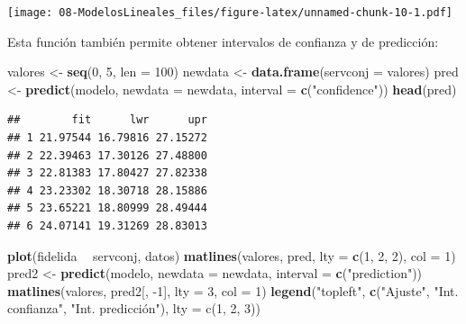 \documentclass[]{book}
\newenvironment{Shaded}{\begin{snugshade}}{\end{snugshade}}
\newcommand{\DataTypeTok}[1]{\textcolor[rgb]{0.13,0.29,0.53}{#1}}
\newcommand{\DecValTok}[1]{\textcolor[rgb]{0.00,0.00,0.81}{#1}}
\newcommand{\KeywordTok}[1]{\textcolor[rgb]{0.13,0.29,0.53}{\textbf{#1}}}
\newcommand{\NormalTok}[1]{#1}
\newcommand{\OperatorTok}[1]{\textcolor[rgb]{0.81,0.36,0.00}{\textbf{#1}}}
\newcommand{\StringTok}[1]{\textcolor[rgb]{0.31,0.60,0.02}{#1}}
\begin{document}
\texttt{[image: 08-ModelosLineales\_files/figure-latex/unnamed-chunk-10-1.pdf]}

Esta función también permite obtener intervalos de confianza y de predicción:

\begin{Shaded}
\begin{Highlighting}[]
\NormalTok{valores <-}\StringTok{ }\KeywordTok{seq}\NormalTok{(}\DecValTok{0}\NormalTok{, }\DecValTok{5}\NormalTok{, }\DataTypeTok{len =} \DecValTok{100}\NormalTok{)}
\NormalTok{newdata <-}\StringTok{ }\KeywordTok{data.frame}\NormalTok{(}\DataTypeTok{servconj =}\NormalTok{ valores)}
\NormalTok{pred <-}\StringTok{ }\KeywordTok{predict}\NormalTok{(modelo, }\DataTypeTok{newdata =}\NormalTok{ newdata, }\DataTypeTok{interval =} \KeywordTok{c}\NormalTok{(}\StringTok{"confidence"}\NormalTok{))}
\KeywordTok{head}\NormalTok{(pred)}
\end{Highlighting}
\end{Shaded}

\begin{verbatim}
##        fit      lwr      upr
## 1 21.97544 16.79816 27.15272
## 2 22.39463 17.30126 27.48800
## 3 22.81383 17.80427 27.82338
## 4 23.23302 18.30718 28.15886
## 5 23.65221 18.80999 28.49444
## 6 24.07141 19.31269 28.83013
\end{verbatim}

\begin{Shaded}
\begin{Highlighting}[]
\KeywordTok{plot}\NormalTok{(fidelida }\OperatorTok{~}\StringTok{ }\NormalTok{servconj, datos)}
\KeywordTok{matlines}\NormalTok{(valores, pred, }\DataTypeTok{lty =} \KeywordTok{c}\NormalTok{(}\DecValTok{1}\NormalTok{, }\DecValTok{2}\NormalTok{, }\DecValTok{2}\NormalTok{), }\DataTypeTok{col =} \DecValTok{1}\NormalTok{)}
\NormalTok{pred2 <-}\StringTok{ }\KeywordTok{predict}\NormalTok{(modelo, }\DataTypeTok{newdata =}\NormalTok{ newdata, }\DataTypeTok{interval =} \KeywordTok{c}\NormalTok{(}\StringTok{"prediction"}\NormalTok{))}
\KeywordTok{matlines}\NormalTok{(valores, pred2[, }\DecValTok{-1}\NormalTok{], }\DataTypeTok{lty =} \DecValTok{3}\NormalTok{, }\DataTypeTok{col =} \DecValTok{1}\NormalTok{)}
\KeywordTok{legend}\NormalTok{(}\StringTok{"topleft"}\NormalTok{, }\KeywordTok{c}\NormalTok{(}\StringTok{"Ajuste"}\NormalTok{, }\StringTok{"Int. confianza"}\NormalTok{, }\StringTok{"Int. predicción"), lty = c(1, 2, 3))}
\end{Highlighting}
\end{Shaded}
\end{document}
